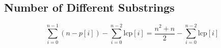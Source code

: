 \subsection{Number of Different Substrings}

\[\sum_{i=0}^{n-1} (n - p[i]) - \sum_{i=0}^{n-2} \text{lcp}[i] = \frac{n^2 + n}{2} - \sum_{i=0}^{n-2} \text{lcp}[i]\]
